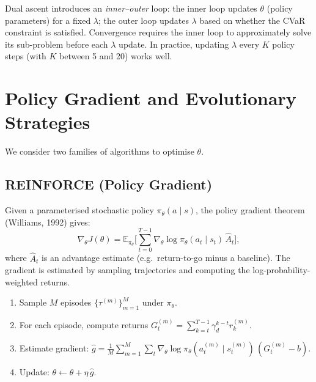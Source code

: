 \documentclass[11pt, a4paper]{article}
\theoremstyle{definition}
\theoremstyle{plain}
\theoremstyle{remark}
\newcommand{\EV}{\mathbb{E}}
\begin{document}
\begin{warningbox}
Dual ascent introduces an \emph{inner--outer} loop: the inner loop updates
$\theta$ (policy parameters) for a fixed $\lambda$; the outer loop updates
$\lambda$ based on whether the CVaR constraint is satisfied. Convergence
requires the inner loop to approximately solve its sub-problem before each
$\lambda$ update. In practice, updating $\lambda$ every $K$ policy steps
(with $K$ between 5 and 20) works well.
\end{warningbox}


\section{Policy Gradient and Evolutionary Strategies}
\label{sec:optimisation}

We consider two families of algorithms to optimise $\theta$.

\subsection{REINFORCE (Policy Gradient)}

Given a parameterised stochastic policy $\pi_\theta(a \mid s)$, the
policy gradient theorem (Williams, 1992) gives:
\begin{equation}
    \nabla_\theta J(\theta)
    = \EV_{\pi_\theta}\!\biggl[
        \sum_{t=0}^{T-1} \nabla_\theta \log \pi_\theta(a_t \mid s_t)\,
        \hat{A}_t
      \biggr],
    \label{eq:reinforce}
\end{equation}
where $\hat{A}_t$ is an advantage estimate (e.g.\ return-to-go minus a
baseline). The gradient is estimated by sampling trajectories and computing
the log-probability-weighted returns.

\begin{algorithmbox}[title={REINFORCE for Portfolio Allocation}]
\begin{enumerate}[leftmargin=1.5em]
    \item Sample $M$ episodes $\{\tau^{(m)}\}_{m=1}^M$ under $\pi_\theta$.
    \item For each episode, compute returns
          $G_t^{(m)} = \sum_{k=t}^{T-1}\gamma_d^{k-t} r_k^{(m)}$.
    \item Estimate gradient:
          $\hat{g} = \frac{1}{M}\sum_{m=1}^M \sum_t
          \nabla_\theta \log\pi_\theta(a_t^{(m)} \mid s_t^{(m)})\,
          (G_t^{(m)} - b)$.
    \item Update: $\theta \leftarrow \theta + \eta\,\hat{g}$.
\end{enumerate}
\end{algorithmbox}
\end{document}
